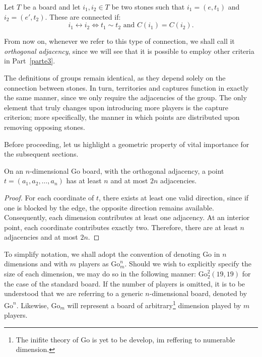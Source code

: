 \begin{definition}[Connection]
	Let $T$ be a board and let $i_1, i_2 \in T$ be two stones such that $i_1 = (e, t_1)$ and $i_2 = (e', t_2)$. These are connected if:
	$$i_1 \leftrightarrow i_2 \iff t_1 \sim t_2 \text{ and } C(i_1) = C(i_2).$$
\end{definition}
From now on, whenever we refer to this type of connection, we shall call it \textit{orthogonal adjacency}, since we will see that it is possible to employ other criteria in Part~\ref{parte3}.

The definitions of groups remain identical, as they depend solely on the connection between stones. In turn, territories and captures function in exactly the same manner, since we only require the adjacencies of the group. The only element that truly changes upon introducing more players is the capture criterion; more specifically, the manner in which points are distributed upon removing opposing stones.

Before proceeding, let us highlight a geometric property of vital importance for the subsequent sections.


\begin{lemma}\label{lem:2n}
	On an \(n\)-dimensional Go board, with the orthogonal adjacency, a point \(t=(a_1,a_2,\dots,a_n)\) has at least \(n\) and at most $2n$ adjacencies.
\end{lemma}


\begin{proof}
	For each coordinate of \(t\), there exists at least one valid direction, since if one is blocked by the edge, the opposite direction remains available. Consequently, each dimension contributes at least one adjacency. At an interior point, each coordinate contributes exactly two. Therefore, there are at least \(n\) adjacencies and at most $2n$.
\end{proof}

To simplify notation, we shall adopt the convention of denoting Go in \(n\) dimensions and with \(m\) players as \(\mathrm{Go}^n_m\). Should we wish to explicitly specify the size of each dimension, we may do so in the following manner: \(\mathrm{Go}^2_2(19,19)\) for the case of the standard board. If the number of players is omitted, it is to be understood that we are referring to a generic \(n\)-dimensional board, denoted by \(\mathrm{Go}^n\). Likewise, \(\mathrm{Go}_m\) will represent a board of arbitrary\footnote{The inifite theory of Go is yet to be develop, im reffering to numerable dimension.} dimension played by \(m\) players.

